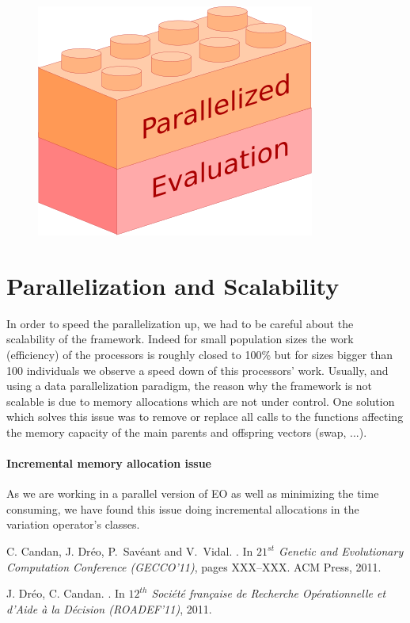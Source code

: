 \begin{figure}[H]
  \centering
  \includegraphics[scale=0.5]{images/parallelized_evaluation_boxes}
\end{figure}

\section{Parallelization and Scalability}

In order to speed the parallelization up, we had to be careful about the scalability of the framework. Indeed for small population sizes the work (efficiency) of the processors is roughly closed to 100\% but for sizes bigger than 100 individuals we observe a speed down of this processors' work. Usually, and using a data parallelization paradigm, the reason why the framework is not scalable is due to memory allocations which are not under control. One solution which solves this issue was to remove or replace all calls to the functions affecting the memory capacity of the main parents and offspring vectors (swap, ...).

\paragraph{Incremental memory allocation issue}

As we are working in a parallel version of EO as well as minimizing the time consuming, we have found this issue doing incremental allocations in the variation operator's classes.


\begin{thebibliography}{10}

C. Candan, J. Dr{\'e}o, P.~Sav\'eant and V.~Vidal.
.
\newblock In {\em $21^{st}$ Genetic and Evolutionary Computation Conference (GECCO'11)}, pages XXX--XXX. ACM Press, 2011.

J. Dr{\'e}o, C. Candan.
.
\newblock In {\em $12^{th}$ Société française de Recherche Opérationnelle et d’Aide à la Décision (ROADEF'11)}, 2011.

\end{thebibliography}




